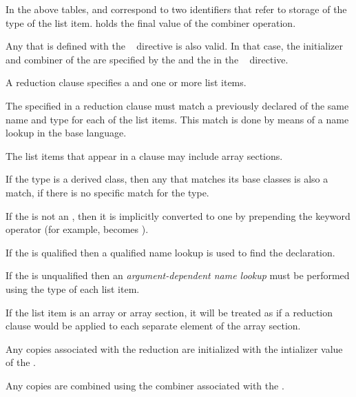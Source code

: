 \vspace{\baselineskip}

In the above tables,  and  correspond to two
identifiers that refer to storage of the type of the list item. 
holds the final value of the combiner operation.

Any  that is defined with the ~
directive is also valid. In that case, the initializer and combiner of the
 are specified by the  and
the  in the ~ directive.




\descr
A reduction clause specifies a  and one or more list
items.

The  specified in a reduction clause must match a
previously declared  of the same name and type for
each of the list items. This match is done by means of a name lookup in the
base language.

The list items that appear in a  clause may include array sections.


\begin{cppspecific}
If the type is a derived class, then any  that
matches its base classes is also a match, if there is no specific match for the
type.

If the  is not an , then it is
implicitly converted to one by prepending the keyword operator (for example,
\code{+} becomes {\code{+}}).

If the  is qualified then a qualified name lookup is
used to find the declaration.

If the  is unqualified then an \emph{argument-dependent name lookup}
must be performed using the type of each list item.
\end{cppspecific}

If the list item is an array or array section, it will be treated as
if a reduction clause would be applied to each separate element
of the array section.

Any copies associated with the reduction are initialized with the intializer
value of the .

Any copies are combined using the combiner associated with the
.


